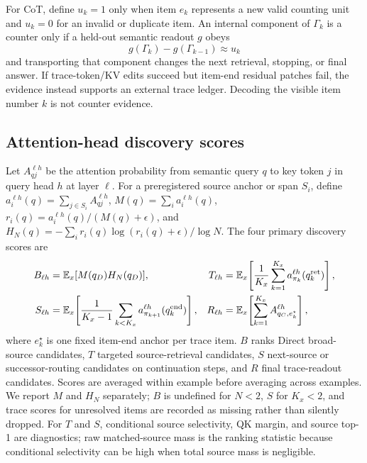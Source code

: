 \documentclass[11pt]{article}
\newcommand{\E}{\mathbb{E}}
\begin{document}
For CoT, define $u_k=1$ only when item $e_k$ represents a new valid counting unit and $u_k=0$ for an invalid or duplicate item. An internal component of $\Gamma_k$ is a counter only if a held-out semantic readout $g$ obeys
\begin{equation}
g(\Gamma_k)-g(\Gamma_{k-1})\approx u_k
\label{eq:counter-update}
\end{equation}
and transporting that component changes the next retrieval, stopping, or final answer. If trace-token/KV edits succeed but item-end residual patches fail, the evidence instead supports an external trace ledger. Decoding the visible item number $k$ is not counter evidence.

\subsection{Attention-head discovery scores}

Let $A_{qj}^{\ell h}$ be the attention probability from semantic query $q$ to key token $j$ in query head $h$ at layer $\ell$. For a preregistered source anchor or span $S_i$, define $a_i^{\ell h}(q)=\sum_{j\in S_i}A_{qj}^{\ell h}$, $M(q)=\sum_i a_i^{\ell h}(q)$, $r_i(q)=a_i^{\ell h}(q)/(M(q)+\epsilon)$, and $H_N(q)=-\sum_i r_i(q)\log(r_i(q)+\epsilon)/\log N$. The four primary discovery scores are
\begin{align}
B_{\ell h}&=\E_x[M(q_D)H_N(q_D)],
& T_{\ell h}&=\E_x\!\left[\frac{1}{K_x}\sum_{k=1}^{K_x}a_{\pi_k}^{\ell h}(q_k^{\rm ret})\right],\\
S_{\ell h}&=\E_x\!\left[\frac{1}{K_x-1}\sum_{k<K_x}a_{\pi_{k+1}}^{\ell h}(q_k^{\rm end})\right],
& R_{\ell h}&=\E_x\!\left[\sum_{k=1}^{K_x}A_{q_C,e_k^\star}^{\ell h}\right],
\label{eq:head-scores}
\end{align}
where $e_k^\star$ is one fixed item-end anchor per trace item. $B$ ranks Direct broad-source candidates, $T$ targeted source-retrieval candidates, $S$ next-source or successor-routing candidates on continuation steps, and $R$ final trace-readout candidates. Scores are averaged within example before averaging across examples. We report $M$ and $H_N$ separately; $B$ is undefined for $N<2$, $S$ for $K_x<2$, and trace scores for unresolved items are recorded as missing rather than silently dropped. For $T$ and $S$, conditional source selectivity, QK margin, and source top-1 are diagnostics; raw matched-source mass is the ranking statistic because conditional selectivity can be high when total source mass is negligible.
\end{document}
